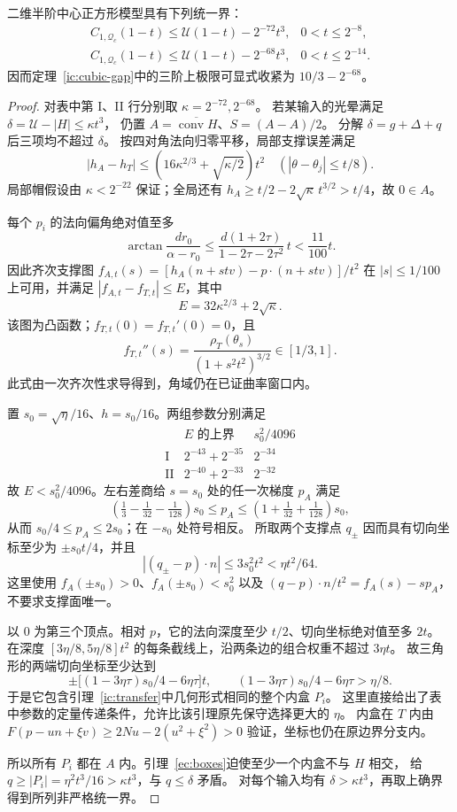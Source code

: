 \begin{theorem}[全体三阶亏损的两组显式常数]\label{ec:cubic}
二维半阶中心正方形模型具有下列统一界：
\[
 \begin{array}{ll}
 C_{1,\mathcal Q_c}(1-t)\le\mathcal U(1-t)-2^{-72}t^3,
   &0<t\le2^{-8},\\[2mm]
 C_{1,\mathcal Q_c}(1-t)\le\mathcal U(1-t)-2^{-68}t^3,
   &0<t\le2^{-14}.
 \end{array}
\]
因而定理~\ref{ic:cubic-gap}中的三阶上极限可显式收紧为 $10/3-2^{-68}$。
\end{theorem}
\begin{proof}
对表中第 I、II 行分别取 $\kappa=2^{-72},2^{-68}$。
若某输入的光晕满足 $\delta=\mathcal U-|H|\le\kappa t^3$，
仍置 $A=\overline{\operatorname{conv}H}$、$S=(A-A)/2$。
分解 $\delta=g+\Delta+q$ 后三项均不超过 $\delta$。
按四对角法向归零平移，局部支撑误差满足
\[
 |h_A-h_T|\le(16\kappa^{2/3}+\sqrt{\kappa/2})t^2
 \quad (|\theta-\theta_j|\le t/8).
\]
局部帽假设由 $\kappa<2^{-22}$ 保证；全局还有
$h_A\ge t/2-2\sqrt\kappa\,t^{3/2}>t/4$，故 $0\in A$。

每个 $p_i$ 的法向偏角绝对值至多
\[
 \arctan\frac{dr_0}{\alpha-r_0}
 \le\frac{d(1+2\tau)}{1-2\tau-2\tau^2}\,t<\frac{11}{100}t.
\]
因此齐次支撑图
$f_{A,t}(s)=[h_A(n+stv)-p\cdot(n+stv)]/t^2$
在 $|s|\le1/100$ 上可用，并满足 $|f_{A,t}-f_{T,t}|\le E$，其中
\[
 E=32\kappa^{2/3}+2\sqrt\kappa.
\]
该图为凸函数；$f_{T,t}(0)=f_{T,t}'(0)=0$，且
\[
 f_{T,t}''(s)=\frac{\rho_T(\theta_s)}{(1+s^2t^2)^{3/2}}
 \in[1/3,1].
\]
此式由一次齐次性求导得到，角域仍在已证曲率窗口内。

置 $s_0=\sqrt\eta/16$、$h=s_0/16$。两组参数分别满足
\[
 \begin{array}{c|cc}
 &E\text{ 的上界}&s_0^2/4096\\\hline
 \mathrm I&2^{-43}+2^{-35}&2^{-34}\\
 \mathrm {II}&2^{-40}+2^{-33}&2^{-32}
 \end{array}
\]
故 $E<s_0^2/4096$。左右差商给 $s=s_0$ 处的任一次梯度 $p_A$ 满足
\[
 \left(\tfrac13-\tfrac1{32}-\tfrac1{128}\right)s_0
 \le p_A\le\left(1+\tfrac1{32}+\tfrac1{128}\right)s_0,
\]
从而 $s_0/4\le p_A\le2s_0$；在 $-s_0$ 处符号相反。
所取两个支撑点 $q_\pm$ 因而具有切向坐标至少为 $\pm s_0t/4$，并且
\[
 |(q_\pm-p)\cdot n|\le3s_0^2t^2<\eta t^2/64.
\]
这里使用 $f_A(\pm s_0)>0$、$f_A(\pm s_0)<s_0^2$ 以及
$(q-p)\cdot n/t^2=f_A(s)-s p_A$，不要求支撑面唯一。

以 $0$ 为第三个顶点。相对 $p$，它的法向深度至少 $t/2$、切向坐标绝对值至多 $2t$。
在深度 $[3\eta/8,5\eta/8]t^2$ 的每条截线上，沿两条边的组合权重不超过 $3\eta t$。
故三角形的两端切向坐标至少达到
\[
 \pm\bigl[(1-3\eta\tau)s_0/4-6\eta\tau\bigr]t,
 \qquad (1-3\eta\tau)s_0/4-6\eta\tau>\eta/8.
\]
于是它包含引理~\ref{ic:transfer}中几何形式相同的整个内盒 $P_i$。
这里直接给出了表中参数的定量传递条件，允许比该引理原先保守选择更大的 $\eta$。
内盒在 $T$ 内由
$F(p-un+\xi v)\ge2Nu-2(u^2+\xi^2)>0$ 验证，坐标也仍在原边界分支内。

所以所有 $P_i$ 都在 $A$ 内。引理~\ref{ec:boxes}迫使至少一个内盒不与 $H$ 相交，
给 $q\ge|P_i|=\eta^2t^3/16>\kappa t^3$，与 $q\le\delta$ 矛盾。
对每个输入均有 $\delta>\kappa t^3$，再取上确界得到所列非严格统一界。
\end{proof}
